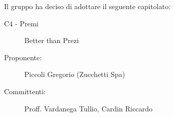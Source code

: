Il gruppo ha deciso di adottare il seguente capitolato:
\begin{description}
  \item[C4 - Premi] Better than Prezi
  \item[Proponente:] Piccoli Gregorio (Zucchetti Spa)
  \item[Committenti:] Proff. Vardanega Tullio, Cardin Riccardo
\end{description}


